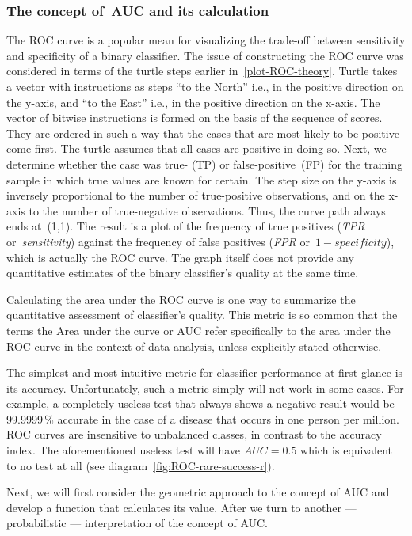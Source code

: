 \documentclass[]{scrreprt}
\begin{document}
\subsubsection{The concept of~AUC and its calculation}\label{calculate-AUC-theory}
The ROC curve is a popular mean for visualizing the trade-off between sensitivity and specificity of a binary classifier. The issue of constructing the ROC curve was considered in terms of the turtle steps earlier in~\ref{plot-ROC-theory}. Turtle takes a vector with instructions as steps ``to the North'' i.e., in the positive direction on the y-axis, and ``to the East'' i.e., in the positive direction on the x-axis. The vector of bitwise instructions is formed on the basis of the sequence of scores. They are ordered in such a way that the cases that are most likely to be positive come first. The turtle assumes that all cases are positive in doing so. Next, we determine whether the case was true- (TP) or false-positive~(FP) for the training sample in which true values are known for certain. The step size on the y-axis is inversely proportional to the number of true-positive observations, and on the x-axis to the number of true-negative observations. Thus, the curve path always ends at~(1,1). The result is a plot of the frequency of true positives (\textit{TPR} or~\textit{sensitivity}) against the frequency of false positives (\textit{FPR} or~$1-specificity$), which is actually the ROC curve. The graph itself does not provide any quantitative estimates of the binary classifier's quality at the same time. 

Calculating the area under the ROC curve is one way to summarize the quantitative assessment of classifier's quality. This metric is so common that the terms the Area under the curve or AUC refer specifically to the area under the ROC curve in the context of data analysis, unless explicitly stated otherwise.

The simplest and most intuitive metric for classifier performance at first glance is its accuracy. Unfortunately, such a metric simply will not work in some cases. For example, a completely useless test that always shows a negative result would be 99.9999\,\% accurate in the case of a disease that occurs in one person per million. ROC curves are insensitive to unbalanced classes, in contrast to the accuracy index. The aforementioned useless test will have $AUC=0.5$ which is equivalent to no test at all (see diagram~\ref{fig:ROC-rare-success-r}).

Next, we will first consider the geometric approach to the concept of AUC and develop a function that calculates its value. After we turn to another --- probabilistic --- interpretation of the concept of AUC.
\end{document}

